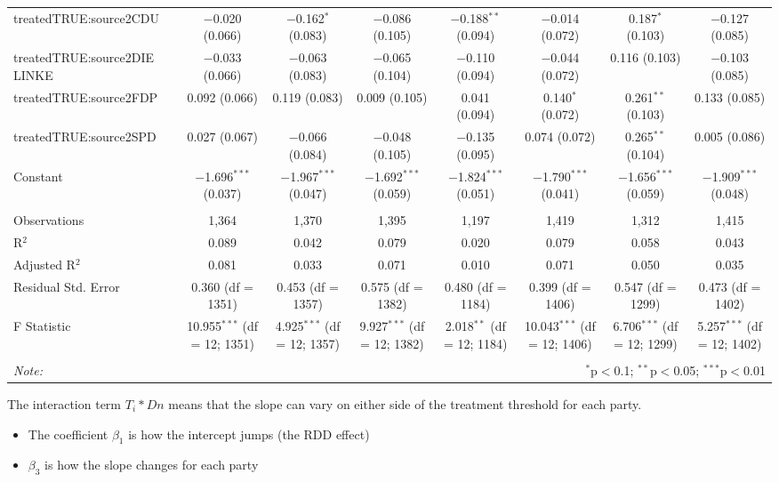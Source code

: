 \documentclass[
]{article}
\providecommand{\tightlist}{%
  \setlength{\itemsep}{0pt}\setlength{\parskip}{0pt}}
\begin{document}
\begin{table}[!htbp]
\begin{tabular}{@{\extracolsep{5pt}}lccccccc}
  treatedTRUE:source2CDU & $-$0.020 (0.066) & $-$0.162$^{*}$ (0.083) & $-$0.086 (0.105) & $-$0.188$^{**}$ (0.094) & $-$0.014 (0.072) & 0.187$^{*}$ (0.103) & $-$0.127 (0.085) \\ 
  treatedTRUE:source2DIE LINKE & $-$0.033 (0.066) & $-$0.063 (0.083) & $-$0.065 (0.104) & $-$0.110 (0.094) & $-$0.044 (0.072) & 0.116 (0.103) & $-$0.103 (0.085) \\ 
  treatedTRUE:source2FDP & 0.092 (0.066) & 0.119 (0.083) & 0.009 (0.105) & 0.041 (0.094) & 0.140$^{*}$ (0.072) & 0.261$^{**}$ (0.103) & 0.133 (0.085) \\ 
  treatedTRUE:source2SPD & 0.027 (0.067) & $-$0.066 (0.084) & $-$0.048 (0.105) & $-$0.135 (0.095) & 0.074 (0.072) & 0.265$^{**}$ (0.104) & 0.005 (0.086) \\ 
  Constant & $-$1.696$^{***}$ (0.037) & $-$1.967$^{***}$ (0.047) & $-$1.692$^{***}$ (0.059) & $-$1.824$^{***}$ (0.051) & $-$1.790$^{***}$ (0.041) & $-$1.656$^{***}$ (0.059) & $-$1.909$^{***}$ (0.048) \\ 
 \hline \\[-1.8ex] 
Observations & 1,364 & 1,370 & 1,395 & 1,197 & 1,419 & 1,312 & 1,415 \\ 
R$^{2}$ & 0.089 & 0.042 & 0.079 & 0.020 & 0.079 & 0.058 & 0.043 \\ 
Adjusted R$^{2}$ & 0.081 & 0.033 & 0.071 & 0.010 & 0.071 & 0.050 & 0.035 \\ 
Residual Std. Error & 0.360 (df = 1351) & 0.453 (df = 1357) & 0.575 (df = 1382) & 0.480 (df = 1184) & 0.399 (df = 1406) & 0.547 (df = 1299) & 0.473 (df = 1402) \\ 
F Statistic & 10.955$^{***}$ (df = 12; 1351) & 4.925$^{***}$ (df = 12; 1357) & 9.927$^{***}$ (df = 12; 1382) & 2.018$^{**}$ (df = 12; 1184) & 10.043$^{***}$ (df = 12; 1406) & 6.706$^{***}$ (df = 12; 1299) & 5.257$^{***}$ (df = 12; 1402) \\ 
\hline 
\hline \\[-1.8ex] 
\textit{Note:}  & \multicolumn{7}{r}{$^{*}$p$<$0.1; $^{**}$p$<$0.05; $^{***}$p$<$0.01} \\ 
\end{tabular} 
\end{table}

The interaction term \(T_i*Dn\) means that the slope can vary on either
side of the treatment threshold for each party.

\begin{itemize}
\tightlist
\item
  The coefficient \(\beta_1\) is how the intercept jumps (the RDD
  effect)
\item
  \(\beta_3\) is how the slope changes for each party
\end{itemize}
\end{document}
